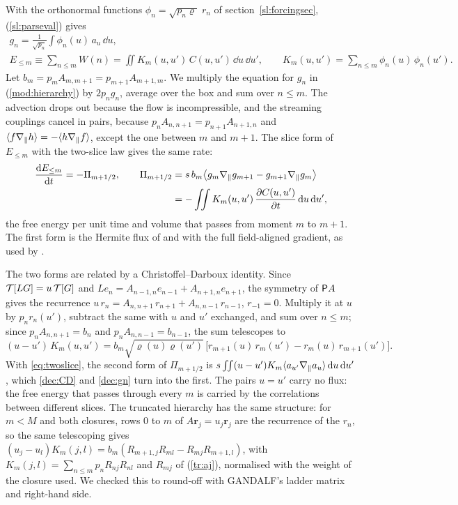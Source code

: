 With the orthonormal functions $\phi_n=\sqrt{p_n\varrho}\;r_n$ of section~\ref{sl:forcingsec}, (\ref{sl:parseval}) gives
\begin{equation}\label{dec:gn}
\begin{gathered}
  g_n=\frac{1}{\sqrt{p_n}}\int\phi_n(u)\,a_u\,\dd u,\\
  E_{\le m}\equiv\sum_{n\le m}W(n)=\iint K_m(u,u')\,C(u,u')\,\dd u\,\dd u',\qquad
  K_m(u,u')=\sum_{n\le m}\phi_n(u)\,\phi_n(u') .
\end{gathered}
\end{equation}
Let $b_m=p_mA_{m,m+1}=p_{m+1}A_{m+1,m}$. We multiply the equation for $g_n$ in (\ref{mod:hierarchy}) by $2p_ng_n$, average over the box and sum over $n\le m$. The advection drops out because the flow is incompressible, and the streaming couplings cancel in pairs, because $p_nA_{n,n+1}=p_{n+1}A_{n+1,n}$ and $\langle f\nabla_\parallel h\rangle=-\langle h\nabla_\parallel f\rangle$, except the one between $m$ and $m+1$. The slice form of $E_{\le m}$ with the two-slice law gives the same rate:
\begin{equation}\label{eq:fluxCD}
\begin{aligned}
  \frac{\mathrm{d} E_{\le m}}{\mathrm{d} t}=-\Pi_{m+1/2},\qquad
  \Pi_{m+1/2}&=s\,b_m\big\langle g_m\nabla_\parallel g_{m+1}-g_{m+1}\nabla_\parallel g_m\big\rangle\\
  &=-\iint K_m(u,u')\,\frac{\partial C(u,u')}{\partial t}\,\mathrm{d} u\,\mathrm{d} u' ,
\end{aligned}
\end{equation}
the free energy per unit time and volume that passes from moment $m$ to $m+1$. The first form is the Hermite flux of \citet{Schekochihin2016} and \citet{AdkinsSchekochihin2018} with the full field-aligned gradient, as used by \citet[eq.~9]{Meyrand2019}.

The two forms are related by a Christoffel--Darboux identity. Since $\mathcal T[LG]=u\,\mathcal T[G]$ and $Le_n=A_{n-1,n}e_{n-1}+A_{n+1,n}e_{n+1}$, the symmetry of $\mathsf P A$ gives the recurrence $u\,r_n=A_{n,n+1}\,r_{n+1}+A_{n,n-1}\,r_{n-1}$, $r_{-1}=0$. Multiply it at $u$ by $p_nr_n(u')$, subtract the same with $u$ and $u'$ exchanged, and sum over $n\le m$; since $p_nA_{n,n+1}=b_n$ and $p_nA_{n,n-1}=b_{n-1}$, the sum telescopes to
\begin{equation}\label{dec:CD}
  (u-u')\,K_m(u,u')=b_m\sqrt{\varrho(u)\varrho(u')}\,\big[r_{m+1}(u)\,r_m(u')-r_m(u)\,r_{m+1}(u')\big] .
\end{equation}
With \eqref{eq:twoslice}, the second form of $\Pi_{m+1/2}$ is $s\iint(u-u')K_m\langle a_{u'}\nabla_\parallel a_u\rangle\,\mathrm{d} u\,\mathrm{d} u'$, which \eqref{dec:CD} and \eqref{dec:gn} turn into the first. The pairs $u=u'$ carry no flux: the free energy that passes through every $m$ is carried by the correlations between different slices. The truncated hierarchy has the same structure: for $m<M$ and both closures, rows $0$ to $m$ of $A\boldsymbol r_j=u_j\boldsymbol r_j$ are the recurrence of the $r_n$, so the same telescoping gives $(u_j-u_l)K_m(j,l)=b_m(R_{m+1,j}R_{ml}-R_{mj}R_{m+1,l})$, with $K_m(j,l)=\sum_{n\le m}p_nR_{nj}R_{nl}$ and $R_{mj}$ of (\ref{tr:aj}), normalised with the weight of the closure used. We checked this to round-off with GANDALF's ladder matrix and right-hand side.


